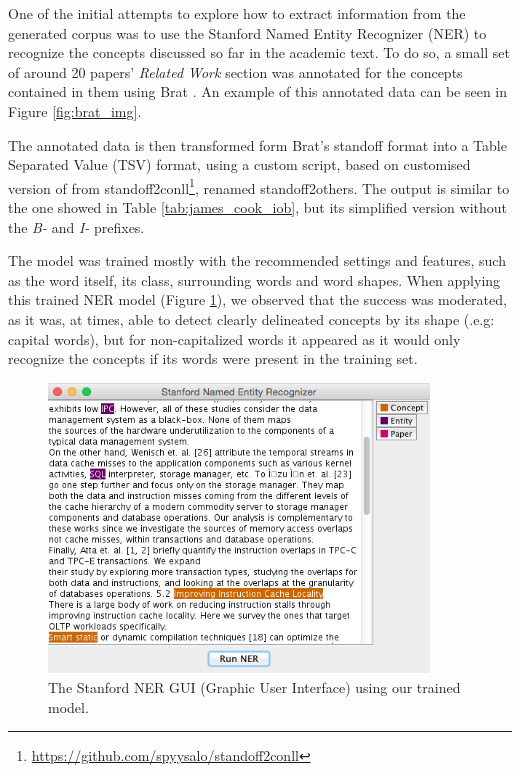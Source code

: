 \documentclass[11pt,a4paper,openright]{memoir}
\begin{document}
One of the initial attempts to explore how to extract information from the generated corpus was to use the Stanford Named Entity Recognizer (NER) to recognize the concepts discussed so far in the academic text. To do so, a small set of around 20 papers' \emph{Related Work} section was annotated for the concepts contained in them using Brat \cite{Stenetorp:2012:BWT:2380921.2380942}. An example of this annotated data can be seen in Figure \ref{fig:brat_img}.

The annotated data is then transformed form Brat's standoff format \cite{Stenetorp:2012:BWT:2380921.2380942} into a Table Separated Value (TSV) format, using a custom script, based on customised version of from standoff2conll\footnote{\url{https://github.com/spyysalo/standoff2conll}}, renamed standoff2others. The output is similar to the one showed in Table \ref{tab:james_cook_iob}, but its simplified version without the \emph{B-} and \emph{I-} prefixes.

The model was trained mostly with the recommended settings and features, such as the word itself, its class, surrounding words and word shapes. When applying this trained NER model (Figure \ref{fig:stanford_ner_usage}), we observed that the success was moderated, as it was, at times, able to detect clearly delineated concepts by its shape (.e.g: capital words), but for non-capitalized words it appeared as it would only recognize the concepts if its words were present in the training set.

\begin{figure}[!htbp]
  \centering
    \includegraphics[width=0.9\textwidth]{./images/stanford_ner}
  \caption[The Stanford NER GUI (Graphic User Interface) using our trained model.]{The Stanford NER GUI (Graphic User Interface) using our trained model.}
  \label{fig:stanford_ner_usage}
\end{figure}
\end{document}
